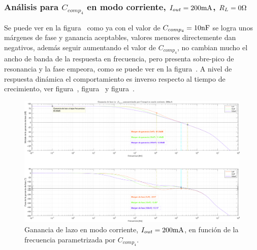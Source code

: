\subsubsection{Análisis para $C_{comp_{4}}$ en modo corriente, $I_{out} = 200 \si[per-mode=symbol]{\milli\ampere}$, $R_{L} = 0 \si[per-mode=symbol]{\ohm}$}

Se puede ver en la figura~ como ya con el valor de $C_{comp_{4}} = 10 \si[per-mode=symbol]{\nano\farad}$ se logra unos márgenes de fase y ganancia aceptables, valores menores directemente dan negativos, además seguir aumentando el valor de $C_{comp_{4}}$, no cambian mucho el ancho de banda de la respuesta en frecuencia, pero presenta sobre-pico de resonancia y  la fase empeora, como se puede ver en la figura~. A nivel de respuesta dinámica el comportamiento es inverso respecto al tiempo de crecimiento, ver figura~, figura~ y figura~.

\vfill



\clearpage

\begin{figure}[H] %
\begin{center}
\includegraphics[width=1.1 \textwidth, angle=90]{./img/plots/loop/power_supply_CCOMP4_LOOP_Modo4.png}
\caption{\label{fig:fig_power_supply_CCOMP4_LOOP_Modo4}\footnotesize{Ganancia de lazo en modo corriente, $I_{out} = 200 \si[per-mode=symbol]{\milli\ampere}$, en función de la frecuencia parametrizada por $C_{comp_{4}}$.}}
\end{center}
\end{figure}


